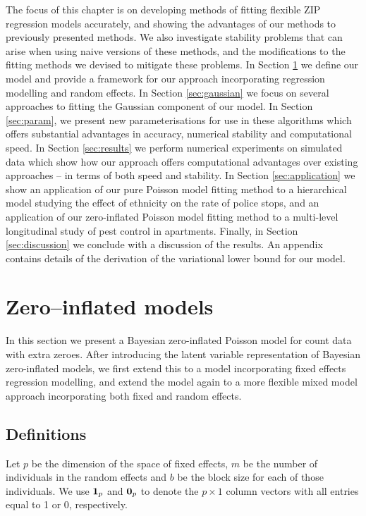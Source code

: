 The focus of this chapter is on developing methods of fitting flexible ZIP regression models accurately, and
showing the advantages of our methods to previously presented methods. We also investigate stability problems
that can arise when using naive versions of these methods, and the modifications to the fitting methods we
devised to mitigate these problems. In Section \ref{sec:model} we define our model and provide a framework for
our approach incorporating regression modelling and random effects. In Section \ref{sec:gaussian} we focus on
several approaches to fitting the Gaussian component of our model. In Section \ref{sec:param}, we present new
parameterisations for use in these algorithms which offers substantial advantages in accuracy, numerical
stability and computational speed. In Section \ref{sec:results} we perform numerical experiments on simulated
data which show how our approach offers computational advantages over existing approaches -- in terms of both
speed and stability. In Section \ref{sec:application} we show an application of our pure Poisson model fitting
method to a hierarchical model studying the effect of ethnicity on the rate of police stops, and an
application of our zero-inflated Poisson model fitting method to a multi-level longitudinal study of pest
control in apartments. Finally, in Section \ref{sec:discussion} we conclude with a discussion of the results.
An appendix contains details of the derivation of the variational lower bound for our model.

\section{Zero--inflated models}
\label{sec:model}

In this section we present a Bayesian zero-inflated Poisson model for count data with extra zeroes. After
introducing the latent variable representation of Bayesian zero-inflated models, we first extend this to
a model incorporating fixed effects regression modelling, and extend the model again to a more flexible mixed 
model approach incorporating both fixed and random effects.

\subsection{Definitions}

Let $p$ be the dimension of the space of fixed effects, $m$ be the number of individuals in the random effects
and $b$ be the block size for each of those individuals. We use ${\bf 1}_p$ and ${\bf 0}_p$ to denote the $p
\times 1$ column vectors with all entries equal to 1 or 0, respectively.

